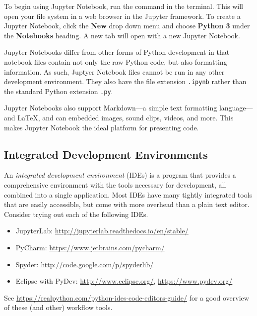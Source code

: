 To begin using Jupyter Notebook, run the command  in the terminal.
This will open your file system in a web browser in the Jupyter framework.
To create a Jupyter Notebook, click the \textbf{New} drop down menu and choose \textbf{Python 3} under the \textbf{Notebooks} heading.
A new tab will open with a new Jupyter Notebook.

Jupyter Notebooks differ from other forms of Python development in that notebook files contain not only the raw Python code, but also formatting information.
As such, Juptyer Notebook files cannot be run in any other development environment.
They also have the file extension \texttt{.ipynb} rather than the standard Python extension \texttt{.py}.

Jupyter Notebooks also support Markdown---a simple text formatting language---and \LaTeX, and can embedded images, sound clips, videos, and more.
This makes Jupyter Notebook the ideal platform for presenting code.

\subsection*{Integrated Development Environments} %

An \emph{integrated development environment} (IDEs) is a program that provides a comprehensive environment with the tools necessary for development, all combined into a single application.
Most IDEs have many tightly integrated tools that are easily accessible, but come with more overhead than a plain text editor.
Consider trying out each of the following IDEs.
\begin{itemize}

\item JupyterLab: \url{http://jupyterlab.readthedocs.io/en/stable/}

\item PyCharm: \url{https://www.jetbrains.com/pycharm/}

\item Spyder: \url{http://code.google.com/p/spyderlib/}

\item Eclipse with PyDev: \url{http://www.eclipse.org/}, \url{https://www.pydev.org/}
%
\end{itemize}
See \url{https://realpython.com/python-ides-code-editors-guide/} for a good overview of these (and other) workflow tools.
